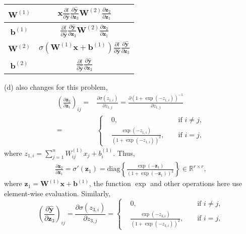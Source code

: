 \documentclass[10pt,a4paper]{article}
\theoremstyle{dotlessP}
\def\RR{\mathbb{R}}
\newcommand{\diag}{\text{diag}}
\newcommand{\dldy}{\frac{\partial l}{\partial \bm{\hat{y}}}}
\newcommand{\dydz}{\frac{\partial \bm{\hat{y}}}{\partial \bm z_3}}
\newcommand{\dzdz}{\frac{\partial \bm z_2}{\partial \bm z_1}}
\begin{document}
\begin{enumerate}[(a)]
\begin{table}[tbhp]
{\begin{center}
\begin{tabular}{|c|c|}
				\hline 
				$\bm W^{(1)}$	& $\bm x\dldy\dydz\bm W^{(2)} \frac{\partial \bm z_2}{\partial \bm z_1}$ \\ 
				\hline 
				$\bm b^{(1)}$&  $\dldy \dydz\bm W^{(2)} \frac{\partial \bm z_2}{\partial \bm z_1}$\\ 
				\hline 
				$\bm W^{(2)}$&  $\sigma\left(\bm W^{(1)} \bm x+\bm b^{(1)}\right) \dldy\dydz$\\ 
				\hline 
				$\bm b^{(2)}$& $\dldy\dydz$ \\ 
				\hline 
			\end{tabular} 
		\end{center}
	}
\end{table}
(d) also changes for this problem, 
\begin{equation}
\begin{aligned}
\left(\dzdz\right)_{ij}=&\frac{\partial \sigma(z_{1,i})}{\partial  z_{1,j}} = \frac{\partial (1+\exp(-z_{1,i}))^{-1}}{\partial  z_{1,j}}\\
= & \left\lbrace 
\begin{aligned}
&0, & &\text{ if } i\neq j ,\\
& \frac{\exp(-z_{1,i}) }{(1+\exp(-z_{1,i}) )^2}, &  &\text{ if } i= j,
\end{aligned}
\right.
\end{aligned}
\end{equation}
where $z_{1,i}=\sum_{j=1}^{n} W^{(1)}_{ij} x_j +b^{(1)}_i $. Thus,
\begin{equation}
\begin{aligned}
\label{eq:dzdz2}
\dzdz =\sigma'(\bm z_1) =\diag\left\lbrace \frac{\exp(-\bm z_1) }{( 1+\exp(-\bm z_1) )^2} \right\rbrace 
 \in \RR^{r\times r},
\end{aligned}
\end{equation}
where $\bm z_1 = \bm W^{(1)} \bm x+\bm b^{(1)}$, the function $\exp$ and other operations here use element-wise evaluation.
Similarly,
\begin{equation}
\left(\dydz\right)_{ij}=\frac{\partial \sigma(z_{3,i})}{\partial  z_{3,j}} 
= \left\lbrace 
\begin{aligned}
&0, & &\text{ if } i\neq j ,\\
& \frac{\exp(-z_{3,i}) }{(1+\exp(-z_{3,i}) )^2}, &  &\text{ if } i= j,
\end{aligned}
\right.
\end{equation}

\end{enumerate}
\end{document}
